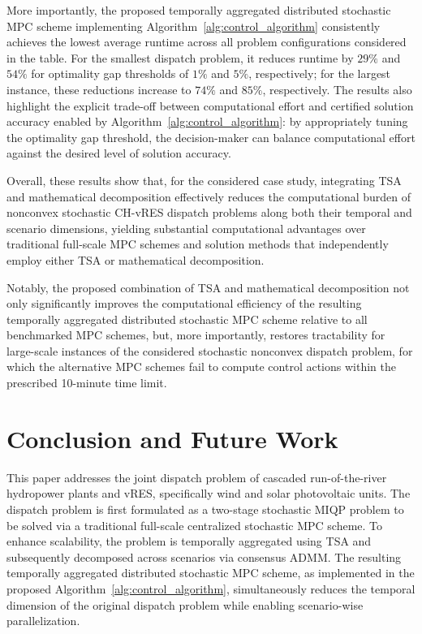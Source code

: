 \documentclass[a4paper,fleqn]{cas-sc}
\begin{document}
More importantly, the proposed temporally aggregated distributed stochastic MPC scheme implementing Algorithm~\ref{alg:control_algorithm} consistently achieves the lowest average runtime across all problem configurations considered in the table.
For the smallest dispatch problem, it reduces runtime by $29\%$ and $54\%$ for optimality gap thresholds of $1\%$ and $5\%$, respectively;
for the largest instance, these reductions increase to $74\%$ and $85\%$, respectively.
The results also highlight the explicit trade-off between computational effort and certified solution accuracy enabled by Algorithm~\ref{alg:control_algorithm}:
by appropriately tuning the optimality gap threshold, the decision-maker can balance computational effort against the desired level of solution accuracy.

Overall, these results show that, for the considered case study,
integrating TSA and mathematical decomposition effectively reduces the computational burden of nonconvex stochastic CH-vRES dispatch problems along both their temporal and scenario dimensions,
yielding substantial computational advantages over traditional full-scale MPC schemes and solution methods that independently employ either TSA or mathematical decomposition.

Notably, the proposed combination of TSA and mathematical decomposition not only significantly improves the computational efficiency of the resulting temporally aggregated distributed stochastic MPC scheme relative to all benchmarked MPC schemes,
but, more importantly, restores tractability for large-scale instances of the considered stochastic nonconvex dispatch problem, for which the alternative MPC schemes fail to compute control actions within the prescribed 10-minute time limit.

\section{Conclusion and Future Work}
\label{sec:conclusions}

This paper addresses the joint dispatch problem of cascaded run-of-the-river hydropower plants and vRES,
specifically wind and solar photovoltaic units.
The dispatch problem is first formulated as a two-stage stochastic MIQP problem
to be solved via a traditional full-scale centralized stochastic MPC scheme.
To enhance scalability, the problem is temporally aggregated using TSA
and subsequently decomposed across scenarios via consensus ADMM.
The resulting temporally aggregated distributed stochastic MPC scheme, as implemented in the proposed Algorithm~\ref{alg:control_algorithm}, simultaneously reduces the temporal dimension of the original dispatch problem while enabling scenario-wise parallelization.
\end{document}
